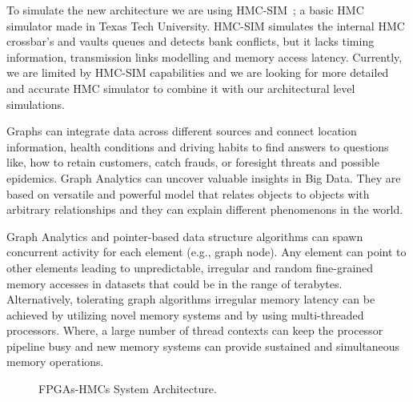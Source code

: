 \documentclass[11pt,twocolumn]{article}
\begin{document}
To simulate the new architecture we are using
HMC-SIM~\cite{HMCSIM}; a basic HMC simulator made in Texas Tech
University. HMC-SIM simulates the internal HMC crossbar's and
vaults queues and detects bank conflicts, but it lacks timing
information, transmission links modelling and memory access
latency. Currently, we are limited by HMC-SIM capabilities and we
are looking for more detailed and accurate HMC simulator to
combine it with our architectural level simulations.

Graphs can integrate data across different sources and connect
location information, health conditions and driving habits to find
answers to questions like, how to retain customers, catch frauds,
or foresight threats and possible epidemics. Graph Analytics can
uncover valuable insights in Big Data. They are based on versatile
and powerful model that relates objects to objects with arbitrary
relationships and they can explain different phenomenons in the
world.

Graph Analytics and pointer-based data structure algorithms can
spawn concurrent activity for each element (e.g., graph node). Any
element can point to other elements leading to unpredictable,
irregular and random fine-grained memory accesses in datasets that
could be in the range of terabytes. Alternatively, tolerating
graph algorithms irregular memory latency can be achieved by
utilizing novel memory systems and by using multi-threaded
processors. Where, a large number of thread contexts can keep the
processor pipeline busy and new memory systems can provide
sustained and simultaneous memory operations.



\begin{figure*}[p]
\centering {} \label{f1}
\end{figure*}

\begin{figure*}[p]
\centering {}  \hspace{3em}  \label{f1}
\end{figure*}


\begin{figure*}[p]
\centering {} \caption[]{FPGAs-HMCs System Architecture.}
\label{f1}
\end{figure*}



\end{document}
